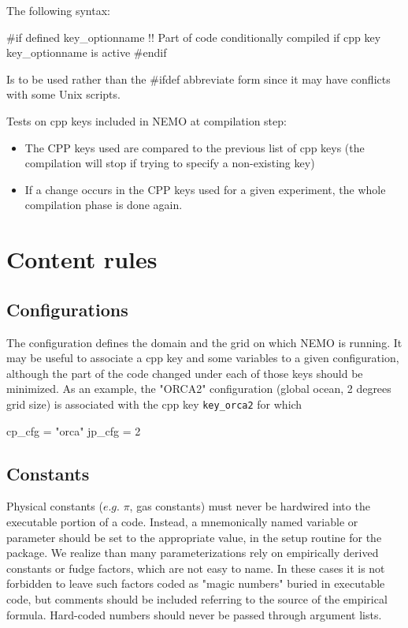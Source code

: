 \documentclass{article}
\begin{document}
The following syntax:

\begin{forlines}
#if defined key_optionname
!! Part of code conditionally compiled if cpp key key_optionname is active
#endif
\end{forlines}

Is to be used rather than the \#ifdef abbreviate form since it may have conflicts with some Unix scripts.

Tests on cpp keys included in NEMO at compilation step:

\begin{itemize}
\item
  The CPP keys used are compared to the previous list of cpp keys
  (the compilation will stop if trying to specify a non-existing key)
\item
  If a change occurs in the CPP keys used for a given experiment, the whole compilation phase is done again.
\end{itemize}
\section{Content rules}

\subsection{Configurations}

The configuration defines the domain and the grid on which NEMO is running.
It may be useful to associate a cpp key and some variables to a given configuration, although
the part of the code changed under each of those keys should be minimized.
As an example, the "ORCA2" configuration (global ocean, 2 degrees grid size) is associated with
the cpp key \texttt{key\_orca2} for which

\begin{forlines}
cp_cfg = "orca"
jp_cfg = 2
\end{forlines}

\subsection{Constants}

Physical constants ($e.g.$ $\pi$, gas constants) must never be hardwired into the executable portion of a code.
Instead, a mnemonically named variable or parameter should be set to the appropriate value,
in the setup routine for the package.
We realize than many parameterizations rely on empirically derived constants or fudge factors,
which are not easy to name.
In these cases it is not forbidden to leave such factors coded as "magic numbers" buried in executable code, but
comments should be included referring to the source of the empirical formula.
Hard-coded numbers should never be passed through argument lists.
\end{document}
